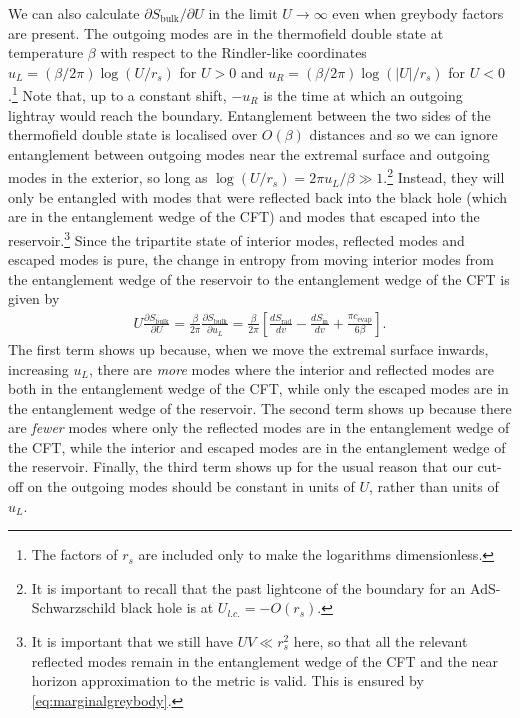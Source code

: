 \documentclass[12pt]{article}
\newcommand{\Srad}{S_\text{rad} }
\begin{document}
We can also calculate $\partial S_\text{bulk}/\partial U$ in the limit $U \to \infty$ even when greybody factors are present. The outgoing modes are in the thermofield double state at temperature $\beta$ with respect to the Rindler-like coordinates $u_L = (\beta / 2 \pi) \log (U/r_s)$ for $U > 0$ and $u_R = (\beta / 2 \pi) \log (|U|/ r_s)$ for $U< 0$.\footnote{The factors of $r_s$ are included only to make the logarithms dimensionless.} Note that, up to a constant shift, $-u_R$ is the time at which an outgoing lightray would reach the boundary. Entanglement between the two sides of the thermofield double state is localised over $O(\beta)$ distances and so we can ignore entanglement between outgoing modes near the extremal surface and outgoing modes in the exterior, so long as $\log (U/r_s) = 2 \pi u_L / \beta \gg 1$.\footnote{It is important to recall that the past lightcone of the boundary for an AdS-Schwarzschild black hole is at $U_{l.c.} = -O(r_s)$.} Instead, they will only be entangled with modes that were reflected back into the black hole (which are in the entanglement wedge of the CFT) and modes that escaped into the reservoir.\footnote{It is important that we still have $UV \ll r_s^2$ here, so that all the relevant reflected modes remain in the entanglement wedge of the CFT and the near horizon approximation to the metric is valid. This is ensured by \eqref{eq:marginalgreybody}.}  Since the tripartite state of interior modes, reflected modes and escaped modes is pure, the change in entropy from moving interior modes from the entanglement wedge of the reservoir to the entanglement wedge of the CFT is given by
\begin{align}
U \frac{\partial S_\text{bulk}}{\partial U} = \frac{\beta}{2 \pi} \frac{\partial S_\text{bulk}}{\partial u_L} =  \frac{\beta}{2 \pi}\left[\frac{d \Srad}{dv} - \frac{d S_\text{in}}{d v} + \frac{\pi c_\text{evap}}{6 \beta}\right].
\end{align}
The first term shows up because, when we move the extremal surface inwards, increasing $u_L$, there are \emph{more} modes where the interior and reflected modes are both in the entanglement wedge of the CFT, while only the escaped modes are in the entanglement wedge of the reservoir. The second term shows up because there are \emph{fewer} modes where only the reflected modes are in the entanglement wedge of the CFT, while the interior and escaped modes are in the entanglement wedge of the reservoir. Finally, the third term shows up for the usual reason that our cut-off on the outgoing modes should be constant in units of $U$, rather than units of $u_L$.
\end{document}
